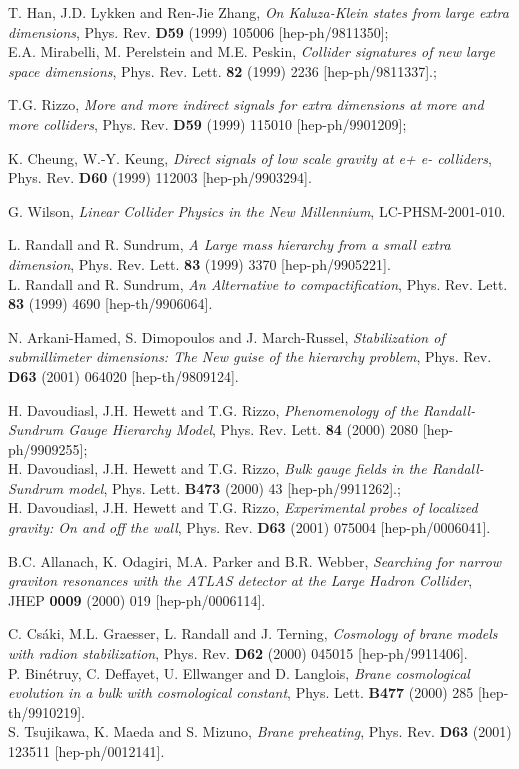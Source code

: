 \documentclass{cernyrep}
\begin{document}
\begin{thebibliography}{100}
T. Han, J.D. Lykken and Ren-Jie Zhang, {\em On Kaluza-Klein states from large extra dimensions}, Phys. Rev. {\bf D59} (1999) 105006 [hep-ph/9811350];\\
E.A. Mirabelli, M. Perelstein and M.E. Peskin, {\em Collider signatures of new large space dimensions}, Phys. Rev.
Lett. {\bf 82} (1999) 2236 [hep-ph/9811337].;

 T.G. Rizzo, {\em More and more indirect signals for extra dimensions at more and more colliders}, Phys. Rev. {\bf D59} (1999) 115010
[hep-ph/9901209];

 K. Cheung, W.-Y. Keung, {\em Direct signals of low scale gravity at e+ e- colliders}, Phys. Rev. {\bf D60} (1999)
112003 [hep-ph/9903294].

G. Wilson, {\it Linear Collider Physics in the New Millennium}, LC-PHSM-2001-010.

L. Randall and R. Sundrum, {\it A Large mass hierarchy from a small extra dimension},  Phys. Rev. Lett. {\bf 83} (1999) 3370 [hep-ph/9905221].\\
L. Randall and R. Sundrum, {\it An Alternative to compactification}, Phys. Rev. Lett. {\bf 83} (1999) 4690 [hep-th/9906064].

N. Arkani-Hamed, S. Dimopoulos and J. March-Russel, {\em Stabilization of submillimeter dimensions: The New guise of the hierarchy problem}, Phys.
Rev. {\bf D63 } (2001) 064020 [hep-th/9809124].

H. Davoudiasl, J.H. Hewett and T.G. Rizzo, {\em Phenomenology of the Randall-Sundrum Gauge Hierarchy Model}, Phys. Rev. Lett.
{\bf 84} (2000) 2080 [hep-ph/9909255];\\
H. Davoudiasl, J.H. Hewett and T.G. Rizzo, {\em Bulk gauge fields in the Randall-Sundrum model}, Phys. Lett. {\bf
B473} (2000) 43 [hep-ph/9911262].;\\
H. Davoudiasl, J.H. Hewett and T.G. Rizzo, {\em Experimental probes of localized gravity: On and off the wall}, Phys. Rev. {\bf
D63} (2001) 075004 [hep-ph/0006041].

B.C. Allanach, K. Odagiri, M.A. Parker and B.R. Webber, {\em Searching for narrow graviton resonances with the ATLAS detector at the Large Hadron Collider}, JHEP
{\bf 0009} (2000) 019 [hep-ph/0006114].

C. Cs\'aki, M.L. Graesser, L. Randall and J. Terning, {\em Cosmology of brane models with radion stabilization}, Phys.
Rev. {\bf D62} (2000) 045015 [hep-ph/9911406].\\
P. Bin\'etruy, C. Deffayet, U. Ellwanger and D. Langlois,
{\em Brane cosmological evolution in a bulk with cosmological constant}, Phys. Lett. {\bf B477} (2000) 285 [hep-th/9910219]. \\
S. Tsujikawa, K. Maeda and S. Mizuno, {\em Brane preheating}, Phys. Rev. {\bf D63}
(2001) 123511 [hep-ph/0012141].


\end{thebibliography}
\end{document}
